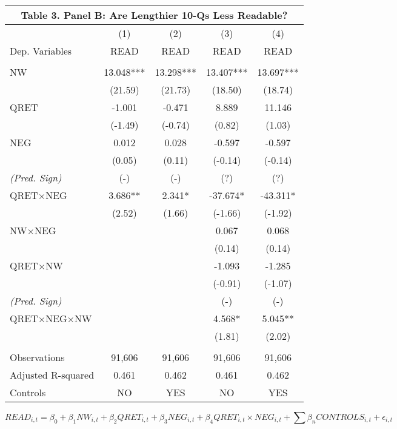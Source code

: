 \begin{table}[H] \label{T3PB}
	\begin{center}
		\begin{tabular}{lcccc}
			\multicolumn{5}{c}{\textbf{Table 3. Panel B: Are Lengthier 10-Qs Less Readable?}} \\
			\midrule
			\midrule
			& (1) & (2) & (3) & (4) \\
			Dep. Variables & READ & READ & READ & READ \\
			\midrule
			&   &   &   &  \\
			NW & 13.048*** & 13.298*** & 13.407*** & 13.697*** \\
			& (21.59) & (21.73) & (18.50) & (18.74) \\
			QRET & -1.001 & -0.471 & 8.889 & 11.146 \\
			& (-1.49) & (-0.74) & (0.82) & (1.03) \\
			NEG & 0.012 & 0.028 & -0.597 & -0.597 \\
			& (0.05) & (0.11) & (-0.14) & (-0.14) \\
			\rowcolor[rgb]{ .933,  .925,  .882}\textit{(Pred. Sign)} & (-) & (-) & (?) & (?) \\
			\rowcolor[rgb]{ .933,  .925,  .882} QRET$\times$NEG & 3.686** & 2.341* & -37.674* & -43.311* \\
			\rowcolor[rgb]{ .933,  .925,  .882} & (2.52) & (1.66) & (-1.66) & (-1.92) \\
			NW$\times$NEG &   &   & 0.067 & 0.068 \\
			&   &   & (0.14) & (0.14) \\
			QRET$\times$NW &   &   & -1.093 & -1.285 \\
			&   &   & (-0.91) & (-1.07) \\
			\rowcolor[rgb]{ .933,  .925,  .882} \textit{(Pred. Sign)} & & &  (-) &  (-)\\
			\rowcolor[rgb]{ .933,  .925,  .882} QRET$\times$NEG$\times$NW &   &   &  4.568* &  5.045** \\
			\rowcolor[rgb]{ .933,  .925,  .882} &   &   & (1.81) & (2.02) \\
			&   &   &   &  \\
			Observations & 91,606 & 91,606 & 91,606 & 91,606 \\
			Adjusted R-squared & 0.461 & 0.462 & 0.461 & 0.462 \\
			Controls & NO & YES & NO & YES \\
			\bottomrule
			\bottomrule
		\end{tabular}%
	\end{center}
		\begin{footnotesize}
			\setcounter{equation}{0}
			\begin{equation*}
				READ_{i,t}=\beta_0+\beta_1NW_{i,t}+\beta_2QRET_{i,t}+\beta_3NEG_{i,t}+\beta_4QRET_{i,t}\times NEG_{i,t}+\sum\beta_nCONTROLS_{i,t}+\epsilon_{i,t}
			\end{equation*}
			

\end{footnotesize}
\end{table}

